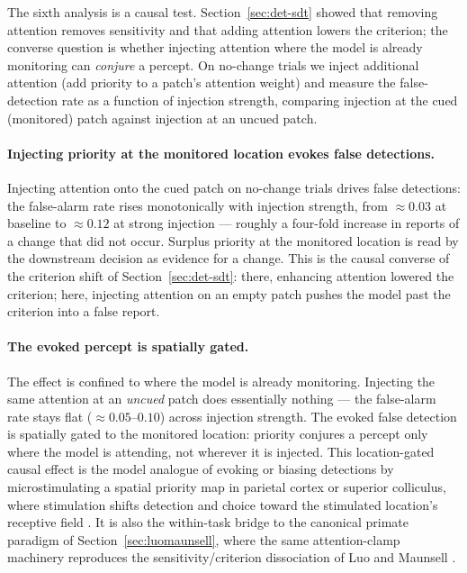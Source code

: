 The sixth analysis is a causal test. Section~\ref{sec:det-sdt} showed that removing
attention removes sensitivity and that adding attention lowers the criterion; the
converse question is whether injecting attention where the model is already
monitoring can \emph{conjure} a percept. On no-change trials we inject additional
attention (add priority to a patch's attention weight) and measure the false-detection
rate as a function of injection strength, comparing injection at the cued (monitored)
patch against injection at an uncued patch.

\paragraph{Injecting priority at the monitored location evokes false detections.}
Injecting attention onto the cued patch on no-change trials drives false detections:
the false-alarm rate rises monotonically with injection strength, from
$\approx\!0.03$ at baseline to $\approx\!0.12$ at strong injection --- roughly a
four-fold increase in reports of a change that did not occur. Surplus priority at the
monitored location is read by the downstream decision as evidence for a change. This
is the causal converse of the criterion shift of Section~\ref{sec:det-sdt}: there,
enhancing attention lowered the criterion; here, injecting attention on an empty
patch pushes the model past the criterion into a false report.

\paragraph{The evoked percept is spatially gated.}
The effect is confined to where the model is already monitoring. Injecting the same
attention at an \emph{uncued} patch does essentially nothing --- the false-alarm rate
stays flat ($\approx\!0.05$--$0.10$) across injection strength. The evoked false
detection is spatially gated to the monitored location: priority conjures a percept
only where the model is attending, not wherever it is injected. This location-gated
causal effect is the model analogue of evoking or biasing detections by
microstimulating a spatial priority map in parietal cortex or superior colliculus,
where stimulation shifts detection and choice toward the stimulated location's
receptive field \cite{RuffCohen2016}. It is also the within-task bridge to the
canonical primate paradigm of Section~\ref{sec:luomaunsell}, where the same
attention-clamp machinery reproduces the sensitivity/criterion dissociation of Luo
and Maunsell \cite{luo_maunsell2018_criterion_sensitivity}.

